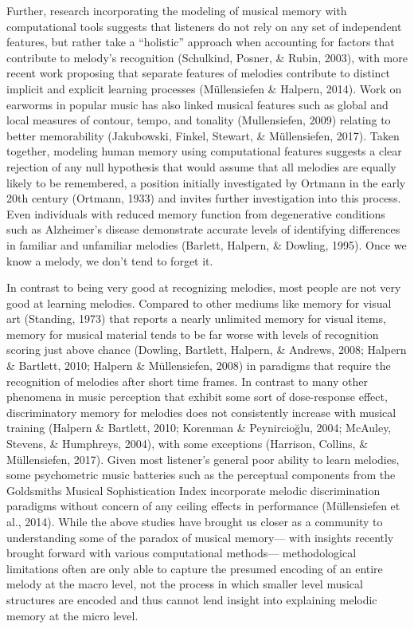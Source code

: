 \documentclass[english,man,floatsintext]{apa6}
\begin{document}
Further, research incorporating the modeling of musical memory with computational tools suggests that listeners do not rely on any set of independent features, but rather take a \enquote{holistic} approach when accounting for factors that contribute to melody's recognition (Schulkind, Posner, \& Rubin, 2003), with more recent work proposing that separate features of melodies contribute to distinct implicit and explicit learning processes (Müllensiefen \& Halpern, 2014).
Work on earworms in popular music has also linked musical features such as global and local measures of contour, tempo, and tonality (Mullensiefen, 2009) relating to better memorability (Jakubowski, Finkel, Stewart, \& Müllensiefen, 2017).
Taken together, modeling human memory using computational features suggests a clear rejection of any null hypothesis that would assume that all melodies are equally likely to be remembered, a position initially investigated by Ortmann in the early 20th century (Ortmann, 1933) and invites further investigation into this process.\\
Even individuals with reduced memory function from degenerative conditions such as Alzheimer's disease demonstrate accurate levels of identifying differences in familiar and unfamiliar melodies (Barlett, Halpern, \& Dowling, 1995).
Once we know a melody, we don't tend to forget it.

In contrast to being very good at recognizing melodies, most people are not very good at learning melodies.
Compared to other mediums like memory for visual art (Standing, 1973) that reports a nearly unlimited memory for visual items, memory for musical material tends to be far worse with levels of recognition scoring just above chance (Dowling, Bartlett, Halpern, \& Andrews, 2008; Halpern \& Bartlett, 2010; Halpern \& Müllensiefen, 2008) in paradigms that require the recognition of melodies after short time frames.
In contrast to many other phenomena in music perception that exhibit some sort of dose-response effect, discriminatory memory for melodies does not consistently increase with musical training (Halpern \& Bartlett, 2010; Korenman \& Peynircioğlu, 2004; McAuley, Stevens, \& Humphreys, 2004), with some exceptions (Harrison, Collins, \& Müllensiefen, 2017).
Given most listener's general poor ability to learn melodies, some psychometric music batteries such as the perceptual components from the Goldsmiths Musical Sophistication Index incorporate melodic discrimination paradigms without concern of any ceiling effects in performance (Müllensiefen et al., 2014).
While the above studies have brought us closer as a community to understanding some of the paradox of musical memory--- with insights recently brought forward with various computational methods--- methodological limitations often are only able to capture the presumed encoding of an entire melody at the macro level, not the process in which smaller level musical structures are encoded and thus cannot lend insight into explaining melodic memory at the micro level.
\end{document}
